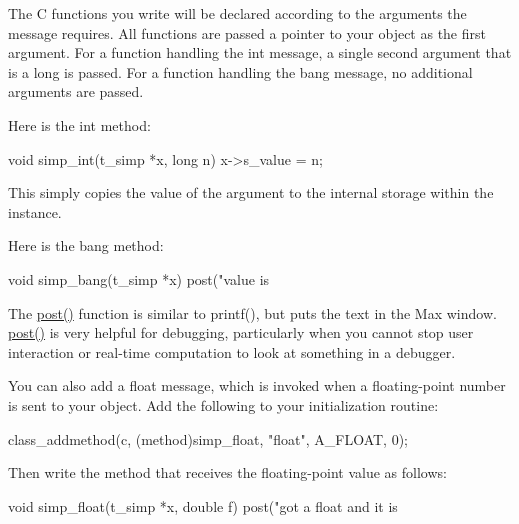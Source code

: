 The C functions you write will be declared according to the arguments the message requires. All functions are passed a pointer to your object as the first argument. For a function handling the int message, a single second argument that is a long is passed. For a function handling the bang message, no additional arguments are passed.

Here is the int method:


\begin{DoxyCode}
    void simp_int(t_simp *x, long n)
    {
        x->s_value = n;
    }
\end{DoxyCode}


This simply copies the value of the argument to the internal storage within the instance.

Here is the bang method:


\begin{DoxyCode}
    void simp_bang(t_simp *x)
    {
        post("value is %
    }
\end{DoxyCode}


The \hyperlink{group__console_ga3714108f42b44384b4d58009eafc1806}{post()} function is similar to printf(), but puts the text in the Max window. \hyperlink{group__console_ga3714108f42b44384b4d58009eafc1806}{post()} is very helpful for debugging, particularly when you cannot stop user interaction or real-\/time computation to look at something in a debugger.

You can also add a float message, which is invoked when a floating-\/point number is sent to your object. Add the following to your initialization routine:


\begin{DoxyCode}
        class_addmethod(c, (method)simp_float, "float", A_FLOAT, 0);
\end{DoxyCode}


Then write the method that receives the floating-\/point value as follows:


\begin{DoxyCode}
    void simp_float(t_simp *x, double f)
    {
        post("got a float and it is %
    }
\end{DoxyCode}
 